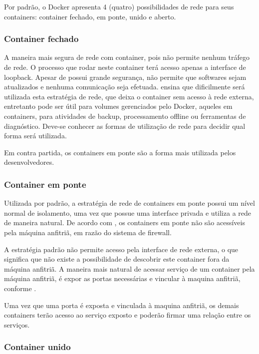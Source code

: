 \documentclass[
	12pt,				%
	openright,			%
	oneside,			%
	a4paper,			%
	chapter=TITLE,		%
	section=TITLE,		%
	english,			%
	french,				%
	spanish,			%
	brazil				%
	]{abntex2}
\begin{document}
Por padrão, o Docker apresenta 4 (quatro) possibilidades de rede para seus containers: container fechado, em ponte, unido e aberto.

\subsubsection{Container fechado}

A maneira mais segura de rede com container, pois não permite nenhum tráfego de rede. O processo que rodar neste container terá acesso apenas a interface de loopback. Apesar de possui grande segurança, não permite que softwares sejam atualizados e nenhuma comunicação seja efetuada.  ensina que dificilmente será utilizada esta estratégia de rede, que deixa o container sem acesso à rede externa, entretanto pode ser útil para volumes gerenciados pelo Docker, aqueles em containers, para atividades de backup, processamento offline ou ferramentas de diagnóstico. Deve-se conhecer as formas de utilização de rede para decidir qual forma será utilizada.

Em contra partida, os containers em ponte são a forma mais utilizada pelos desenvolvedores.

\subsubsection{Container em ponte}

Utilizada por padrão, a estratégia de rede de containers em ponte possui um nível normal de isolamento, uma vez que possue uma interface privada e utiliza a rede de maneira natural. De acordo com , os containers em ponte não são acessíveis pela máquina anfitriã, em razão do sistema de firewall.

A estratégia padrão não permite acesso pela interface de rede externa, o que significa que não existe a possibilidade de descobrir este container fora da máquina anfitriã. A maneira mais natural de acessar serviço de um container pela máquina anfitriã, é expor as portas necessárias e vincular à maquina anfitriã, conforme .

Uma vez que uma porta é exposta e vinculada à maquina anfitriã, os demais containers terão acesso ao serviço exposto e poderão firmar uma relação entre os serviços.

\subsubsection{Container unido}
\end{document}

